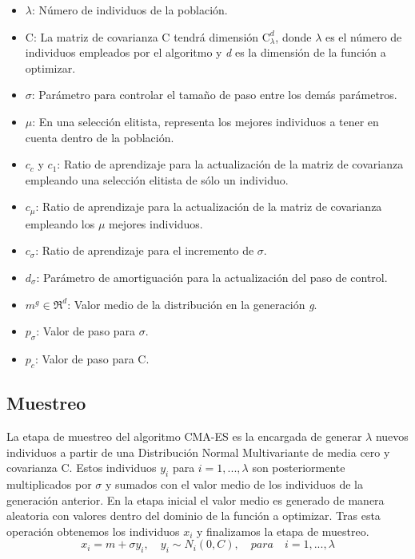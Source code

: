 \begin{itemize}
\item $\lambda$: Número de individuos de la población.
\item C: La matriz de covarianza C tendrá dimensión $\textrm{C}_{\lambda}^{d}$, donde $\lambda$ es el número de individuos empleados por el algoritmo y \textit{d} es la dimensión de la función a optimizar.
\item $\sigma$: Parámetro para controlar el tamaño de paso entre los demás parámetros.
\item $\mu$: En una selección elitista, representa los mejores individuos a tener en cuenta dentro de la población.
\item $c_{c}$ y $c_{1}$: Ratio de aprendizaje para la actualización de la matriz de covarianza empleando una selección elitista de sólo un individuo.
\item $c_{\mu}$: Ratio de aprendizaje para la actualización de la matriz de covarianza empleando los $\mu$ mejores individuos.
\item $c_{\sigma}$: Ratio de aprendizaje para el incremento de $\sigma$.
\item $d_{\sigma}$: Parámetro de amortiguación para la actualización del paso de control.
\item $m^{g} \in \Re^{d}$: Valor medio de la distribución en la generación \textit{g}.
\item $p_{\sigma}$: Valor de paso para $\sigma$.
\item $p_{c}$: Valor de paso para C.
\end{itemize}

\subsection{Muestreo}
La etapa de muestreo del algoritmo CMA-ES es la encargada de generar $\lambda$ nuevos individuos a partir de una Distribución Normal Multivariante de media cero y covarianza C. Estos individuos $y_{i}$ para $ i=1,...,\lambda $ son posteriormente multiplicados por $\sigma$ y sumados con el valor medio de los individuos de la generación anterior. En la etapa inicial el valor medio es generado de manera aleatoria con valores dentro del dominio de la función a optimizar. Tras esta operación obtenemos los individuos $x_{i}$ y finalizamos la etapa de muestreo.
\begin{equation} \label{eq:1}
        x_{i} = m + \sigma y_{i},\quad y_{i}\sim N_{i}(0, C),\quad para\quad i=1,...,\lambda 
\end{equation}

